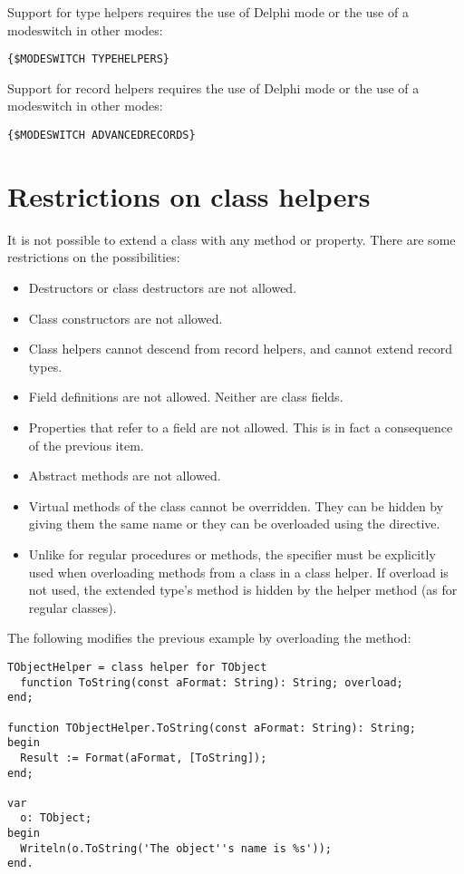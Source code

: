 \begin{remark}
Support for type helpers requires the use of Delphi mode or the use of a
 modeswitch in other modes:
\begin{verbatim}
{$MODESWITCH TYPEHELPERS}
\end{verbatim}
\end{remark}

\begin{remark}
Support for record helpers requires the use of Delphi mode or the use of a
 modeswitch in other modes:
\begin{verbatim}
{$MODESWITCH ADVANCEDRECORDS}
\end{verbatim}
\end{remark}

\section{Restrictions on class helpers}
It is not possible to extend a class with any method or property. There are
some restrictions on the possibilities:
\begin{itemize}
\item Destructors or class destructors are not allowed.
\item Class constructors are not allowed. 
\item Class helpers cannot descend from record helpers, and cannot extend record types.
\item Field definitions are not allowed. Neither are class fields.
\item Properties that refer to a field are not allowed. This is in fact a
consequence of the previous item.
\item Abstract methods are not allowed.
\item Virtual methods of the class cannot be overridden. They can be hidden
by giving them the same name or they can be overloaded using the
 directive.
\item Unlike for regular procedures or methods, the  specifier must 
be explicitly used when overloading methods from a class in a class helper. 
If overload is not used, the extended type's method is hidden by the helper method
(as for regular classes).
\end{itemize}
The following modifies the previous example by overloading the 
method:
\begin{verbatim}
TObjectHelper = class helper for TObject
  function ToString(const aFormat: String): String; overload;
end;
 
function TObjectHelper.ToString(const aFormat: String): String;
begin
  Result := Format(aFormat, [ToString]);
end;
 
var
  o: TObject;
begin
  Writeln(o.ToString('The object''s name is %s'));
end.
\end{verbatim}

